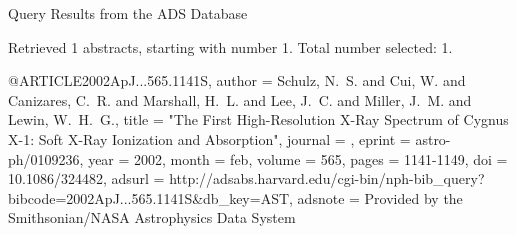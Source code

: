 Query Results from the ADS Database


Retrieved 1 abstracts, starting with number 1.  Total number selected: 1.

@ARTICLE{2002ApJ...565.1141S,
   author = {{Schulz}, N.~S. and {Cui}, W. and {Canizares}, C.~R. and {Marshall}, H.~L. and 
	{Lee}, J.~C. and {Miller}, J.~M. and {Lewin}, W.~H.~G.},
    title = "{The First High-Resolution X-Ray Spectrum of Cygnus X-1: Soft X-Ray Ionization and Absorption}",
  journal = {\apj},
   eprint = {astro-ph/0109236},
     year = 2002,
    month = feb,
   volume = 565,
    pages = {1141-1149},
      doi = {10.1086/324482},
   adsurl = {http://adsabs.harvard.edu/cgi-bin/nph-bib_query?bibcode=2002ApJ...565.1141S&db_key=AST},
  adsnote = {Provided by the Smithsonian/NASA Astrophysics Data System}
}


